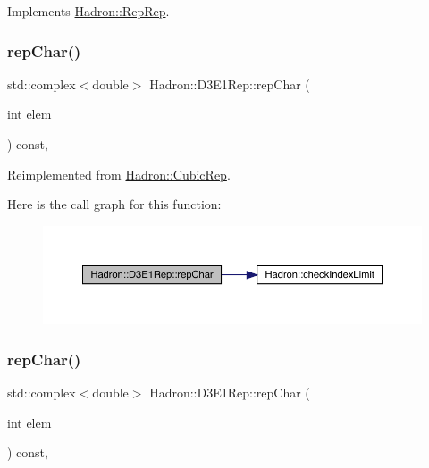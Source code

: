 Implements \mbox{\hyperlink{structHadron_1_1RepRep_ab3213025f6de249f7095892109575fde}{Hadron\+::\+Rep\+Rep}}.

\mbox{\label{structHadron_1_1D3E1Rep_a67caadd543a2e693c1be006d8e11742c}} 
\subsubsection{\texorpdfstring{repChar()}{repChar()}\hspace{0.1cm}{\footnotesize\ttfamily [1/3]}}
{\footnotesize\ttfamily std\+::complex$<$double$>$ Hadron\+::\+D3\+E1\+Rep\+::rep\+Char (\begin{DoxyParamCaption}\item[{int}]{elem }\end{DoxyParamCaption}) const\hspace{0.3cm}{\ttfamily [inline]}, {\ttfamily [virtual]}}



Reimplemented from \mbox{\hyperlink{structHadron_1_1CubicRep_af45227106e8e715e84b0af69cd3b36f8}{Hadron\+::\+Cubic\+Rep}}.

Here is the call graph for this function\+:
\nopagebreak
\begin{figure}[H]
\begin{center}
\leavevmode
\includegraphics[width=350pt]{d3/daf/structHadron_1_1D3E1Rep_a67caadd543a2e693c1be006d8e11742c_cgraph}
\end{center}
\end{figure}
\mbox{\label{structHadron_1_1D3E1Rep_a67caadd543a2e693c1be006d8e11742c}} 
\subsubsection{\texorpdfstring{repChar()}{repChar()}\hspace{0.1cm}{\footnotesize\ttfamily [2/3]}}
{\footnotesize\ttfamily std\+::complex$<$double$>$ Hadron\+::\+D3\+E1\+Rep\+::rep\+Char (\begin{DoxyParamCaption}\item[{int}]{elem }\end{DoxyParamCaption}) const\hspace{0.3cm}{\ttfamily [inline]}, {\ttfamily [virtual]}}



